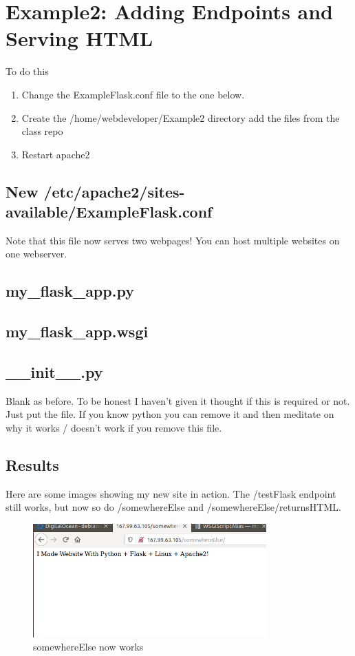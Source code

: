 \documentclass[10pt]{article}
\begin{document}
\section{Example2: Adding Endpoints and Serving HTML}
To do this
\begin{enumerate}
\item Change the ExampleFlask.conf file to the one below.
\item Create the /home/webdeveloper/Example2 directory add the files from the class repo
\item Restart apache2
\end{enumerate}

\subsection{New /etc/apache2/sites-available/ExampleFlask.conf}
Note that this file now serves two webpages! You can host multiple websites on one webserver.


\subsection{my\_flask\_app.py}


\subsection{my\_flask\_app.wsgi}


\subsection{\_\_init\_\_.py}
Blank as before. To be honest I haven't given it thought if this is required or not. Just put the file. If you know python you can remove it and then meditate on why it works / doesn't work if you remove this file.

\subsection{ Results }
Here are some images showing my new site in action. The /testFlask endpoint still works, but now so do /somewhereElse and /somewhereElse/returnsHTML.

\begin{figure}[h]
  \centering
    \includegraphics[width=0.8\textwidth]{somewhereElse.png}
  \caption{somewhereElse now works}
\end{figure}
\end{document}
